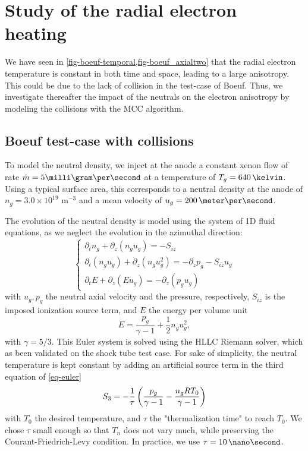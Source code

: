 
\section{Study of the radial electron heating}
\label{sec-rheating}
    We have seen in \cref{fig-boeuf-temporal,fig-boeuf_axialtwo} that the radial electron temperature is constant in both time and space, leading to a large anisotropy.
    This could be due to the lack of collision in the test-case of Boeuf.
    Thus, we investigate thereafter the impact of the neutrals on the electron anisotropy by modeling the collisions with the \ac{MCC} algorithm.
    
  \subsection{Boeuf test-case with collisions} \label{subsec-MCC_boeuf}

    To model the neutral density, we inject at the anode a constant xenon flow of rate $\dot{m} = 5 \milli\gram\per\second$ at a temperature of $T_g = 640\,\kelvin$.
    Using a typical surface area, this corresponds to a neutral density at the anode of $n_g=3.0 \times 10^{19}$ {m}$^{-3}$ and a mean velocity of $u_g = 200 \,\meter\per\second$.
    
    The evolution of the neutral density is model using the system of \ac{1D} fluid equations, as we neglect the evolution in the azimuthal direction\string:
    \begin{equation}
    \left\{
    \begin{gathered}
    \partial_{t} n_g + \partial_{z}(n_g u_g) = - S_{iz}\\
    \partial_{t}(n_g u_g) + \partial_{z}(n_g u_g^{2}) = -\partial_{z}p_g - S_{iz} u_g \\
    \partial_{t}E + \partial_{z}(Eu_g) = - \partial_{z}(p_g u_g)
    \end{gathered}
    \right.
    \label{eq-euler}
    \end{equation}
    with $u_g, p_g$ the neutral axial velocity and the pressure, respectively, $S_{iz}$ is the imposed ionization source term, and $E$ the energy per volume unit
    \begin{equation}
      E =  \frac{p_g}{\gamma - 1} + \frac{1}{2} n_g u_g^{2},
    \end{equation}
    with $\gamma=5/3$.
    This Euler system is solved using the HLLC Riemann solver, which as been validated on the  shock tube test case.
    For sake of simplicity, the neutral temperature is kept constant by adding an artificial source term in the third equation of \cref{eq-euler}
    \begin{equation} \label{eq-artificial}
      S_3 = -\frac{1}{\tau} \left(  \frac{p_g}{\gamma - 1} - \frac{n_g R T_0}{\gamma-1} \right)
    \end{equation}
    with $T_0$ the desired temperature, and $\tau$ the "thermalization time" to reach $T_0$.
    We chose $\tau$ small enough so that $T_n$ does not vary much, while preserving the Courant-Friedrich-Levy condition.
    In practice, we use $\tau = 10\,\nano\second$.
    
